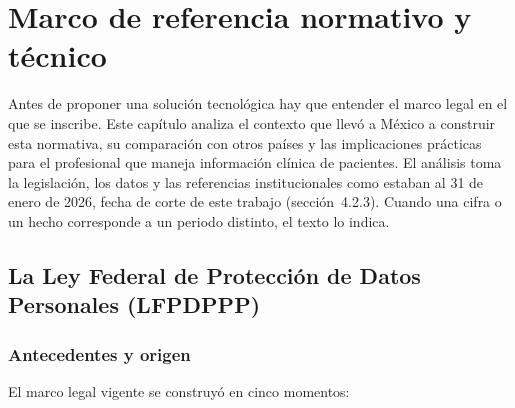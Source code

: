 \documentclass[12pt, a4paper]{article}
\makeatletter
\newcommand{\saltoseccion}{\par
  \ifx\@deferlist\@empty
    \ifdim\pagegoal<\maxdimen
      \ifdim\dimexpr\textheight-\pagegoal+\pagetotal\relax>0.5\textheight\clearpage\fi
    \fi
  \else\clearpage\fi}
\let\seccionbase\section
\renewcommand{\section}{\saltoseccion\seccionbase}
\makeatother
\begin{document}
\section{Marco de referencia normativo y técnico}
Antes de proponer una solución tecnológica hay que entender el marco
legal en el que se inscribe. Este capítulo analiza el contexto que llevó
a México a construir esta normativa, su comparación con otros países y
las implicaciones prácticas para el profesional que maneja información
clínica de pacientes. El análisis toma la legislación, los datos y las
referencias institucionales como estaban al 31 de enero de 2026, fecha
de corte de este trabajo (sección~4.2.3). Cuando una cifra o un hecho
corresponde a un periodo distinto, el texto lo indica.
 
\subsection[La Ley Federal de Protección de Datos Personales (LFPDPPP)]{La Ley Federal de Protección de Datos\\ Personales (LFPDPPP)}
 
\subsubsection{Antecedentes y origen}
 
El marco legal vigente se construyó en cinco momentos:
 
\end{document}
